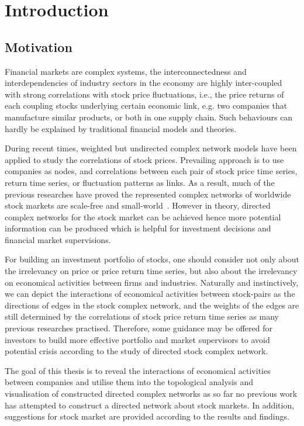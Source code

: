 \chapter{Introduction}
\section{Motivation}
Financial markets are complex systems, the interconnectedness and interdependencies of industry sectors in the economy are highly inter-coupled with strong correlations with stock price fluctuations, i.e., the price returns of each coupling stocks underlying certain economic link, e.g. two companies that manufacture similar products, or both in one supply chain. Such behaviours can hardly be explained by traditional financial models and theories.

During recent times, weighted but undirected complex network models have been applied to study the correlations of stock prices. Prevailing approach is to use companies as nodes, and correlations between each pair of stock price time series, return time series, or fluctuation patterns as links. As a result, much of the previous researches have proved the represented complex networks of worldwide stock markets are scale-free and small-world~\cite{cnsm, perspective}. However in theory, directed complex networks for the stock market can be achieved hence more potential information can be produced which is helpful for investment decisions and financial market supervisions.

For building an investment portfolio of stocks, one should consider not only about the irrelevancy on price or price return time series, but also about the irrelevancy on economical activities between firms and industries. Naturally and instinctively, we can depict the interactions of economical activities between stock-pairs as the directions of edges in the stock complex network, and the weights of the edges are still determined by the correlations of stock price return time series as many previous researches practised. Therefore, some guidance may be offered for investors to build more effective portfolio and market supervisors to avoid potential crisis according to the study of directed stock complex network.


The goal of this thesis is to reveal the interactions of economical activities between companies and utilise them into the topological analysis and visualisation of constructed directed complex networks as so far no previous work has attempted to construct a directed network about stock markets. In addition, suggestions for stock market are provided according to the results and findings.

